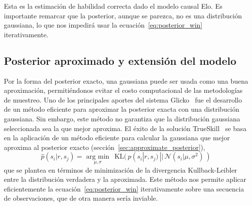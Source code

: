 \documentclass[a4paper,11pt]{book}
\newcommand{\N}{\mathcal{N}}
\theoremstyle{definition}
\begin{document}

Esta es la estimaci\'on de habilidad correcta dado el modelo causal Elo.
%
Es importante remarcar que la posterior, aunque se parezca, no es una distribuci\'on gaussiana, lo que nos impedir\'a usar la ecuaci\'on~\eqref{eq:posterior_win} iterativamente.


\subsection{Posterior aproximado y extensi\'on del modelo}

Por la forma del posterior exacto, una gaussiana puede ser usada como una buena aproximaci\'on, permiti\'endonos evitar el costo computacional de las metodolog\'ias de muestreo.
%
Uno de los principales aportes del sistema Glicko~\cite{Glikman2013} fue el desarrollo de un m\'etodo eficiente para aproximar la posterior exacta con una distribuci\'on gaussiana.
%
Sin embargo, este m\'etodo no garantiza que la distribuci\'on gaussiana seleccionada sea la que mejor aproxima.
%
El \'exito de la soluci\'on TrueSkill~\cite{Herbrich2007} se basa en la aplicaci\'on de un m\'etodo eficiente para calcular la gaussiana que mejor aproxima al posterior exacto (secci\'on~\ref{sec:approximate_posterior}),
%
\begin{equation} \label{eq:approx}
 \widehat{p}(s_i| r, s_j) = \underset{\mu, \sigma}{\text{ arg min }} \ \ \text{KL}(\, p(s_i| r, s_j) \, || \,  \N(s_i|\mu, \sigma^2) \, )
\end{equation}
que se plantea en t\'erminos de minimizaci\'on de la divergencia Kullback-Leibler entre la distribuci\'on verdadera y la aproximada.
%
Este m\'etodo nos permite aplicar eficientemente la ecuaci\'on~\eqref{eq:posterior_win} iterativamente sobre una secuencia de observaciones, que de otra manera ser\'ia inviable.

\end{document}

